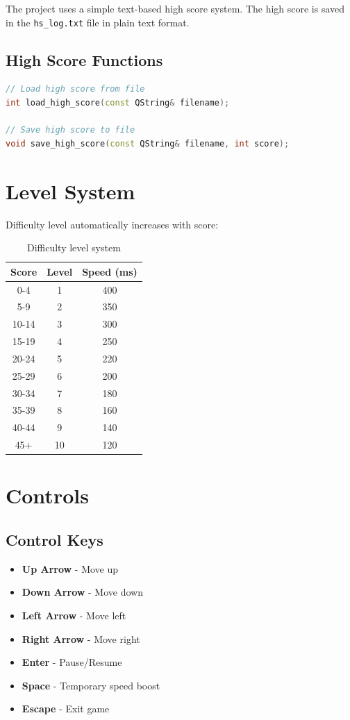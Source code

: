 \documentclass[12pt,a4paper]{article}
\begin{document}
The project uses a simple text-based high score system. The high score is saved in the \texttt{hs\_log.txt} file in plain text format.

\subsection{High Score Functions}
\begin{lstlisting}[language=C++]
// Load high score from file
int load_high_score(const QString& filename);

// Save high score to file
void save_high_score(const QString& filename, int score);
\end{lstlisting}

\section{Level System}

Difficulty level automatically increases with score:

\begin{table}[H]
\centering
\begin{tabular}{|c|c|c|}
\hline
\textbf{Score} & \textbf{Level} & \textbf{Speed (ms)} \\
\hline
0-4 & 1 & 400 \\
5-9 & 2 & 350 \\
10-14 & 3 & 300 \\
15-19 & 4 & 250 \\
20-24 & 5 & 220 \\
25-29 & 6 & 200 \\
30-34 & 7 & 180 \\
35-39 & 8 & 160 \\
40-44 & 9 & 140 \\
45+ & 10 & 120 \\
\hline
\end{tabular}
\caption{Difficulty level system}
\end{table}

\section{Controls}

\subsection{Control Keys}
\begin{itemize}
    \item \textbf{Up Arrow} - Move up
    \item \textbf{Down Arrow} - Move down
    \item \textbf{Left Arrow} - Move left
    \item \textbf{Right Arrow} - Move right
    \item \textbf{Enter} - Pause/Resume
    \item \textbf{Space} - Temporary speed boost
    \item \textbf{Escape} - Exit game
\end{itemize}
\end{document}
